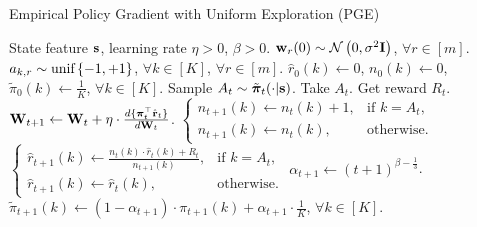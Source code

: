 \begin{algorithm}[t]
\caption{Empirical Policy Gradient with Uniform Exploration (PGE)}
\label{alg:policy_gradient_uniform_exploration}
\begin{algorithmic}
    State feature ${\mathbf{s}}$, learning rate $\eta > 0$, $\beta > 0$.
   \STATE ${\mathbf{w}}_r(0) \sim {\mathcal{N}}\left( 0, \sigma^2 {\mathbf{I}} \right)$, $\forall r \in [m]$. $a_{k, r} \sim 
   {\text{unif}}\left\{-1, +1\right\}$, $\forall k \in [K]$, $\forall r \in [m]$.
   \STATE $\hat{r}_{0}(k) \gets 0$, $n_{0}(k) \gets 0$, $\tilde{\pi}_0(k) \gets \frac{1}{K}$, $\forall k \in [K]$.
   \STATE Sample $A_{t} \sim \tilde{{\boldsymbol{\pi}}}_{t}(\cdot | {\mathbf{s}} )$. Take $A_{t}$. Get reward $R_{t}$.
   \STATE ${\mathbf{W}}_{t+1} \leftarrow {\mathbf{W}}_t + \eta \cdot \frac{d \{ {\boldsymbol{\pi}}_t^\top \hat{{\mathbf{r}}}_t \} }{d {\mathbf{W}}_t}$.
   \STATE $\left. 
		\begin{cases}
		n_{t+1}(k) \gets  n_{t}(k) + 1, & \text{if } k = A_t, \\
		n_{t+1}(k) \gets n_{t}(k), & \text{otherwise}.
		\end{cases}
		\right. \qquad$ 
   $\left. 
		\begin{cases}
		\hat{r}_{t+1}(k) \gets \frac{n_{t}(k) \cdot \hat{r}_{t}(k) + R_{t} }{n_{t+1}(k)}, & \text{if } k = A_t, \\
		\hat{r}_{t+1}(k) \gets \hat{r}_{t}(k), & \text{otherwise}.
		\end{cases}
		\right.$
		\STATE $\alpha_{t+1} \gets (t+1)^{ \beta - \frac{1}{3}}$.
   \STATE $\tilde{\pi}_{t+1}(k) \gets ( 1 - \alpha_{t+1} ) \cdot  \pi_{t+1}(k) + \alpha_{t+1} \cdot \frac{1}{K}$, $\forall k \in [K]$.
   \ENDFOR
\end{algorithmic}
\end{algorithm}

